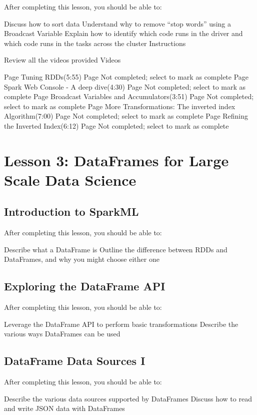 After completing this lesson, you should be able to:

Discuss how to sort data
Understand why to remove “stop words” using a Broadcast Variable
Explain how to identify which code runs in the driver and which code runs in the tasks across the cluster
Instructions

Review all the videos provided
Videos

Page Tuning RDDs(5:55) Page Not completed; select to mark as complete
Page Spark Web Console - A deep dive(4:30) Page Not completed; select to mark as complete
Page Broadcast Variables and Accumulators(3:51) Page Not completed; select to mark as complete
Page More Transformations: The inverted index Algorithm(7:00) Page Not completed; select to mark as complete
Page Refining the Inverted Index(6:12) Page Not completed; select to mark as complete


\newpage
\section{Lesson 3: DataFrames for Large Scale Data Science}

\subsection{Introduction to SparkML}

After completing this lesson, you should be able to:

Describe what a DataFrame is
Outline the difference between RDDs and DataFrames, and why you might choose either one

\subsection{Exploring the DataFrame API}

After completing this lesson, you should be able to:

Leverage the DataFrame API to perform basic transformations
Describe the various ways DataFrames can be used
\subsection{DataFrame Data Sources I}

After completing this lesson, you should be able to:

Describe the various data sources supported by DataFrames
Discuss how to read and write JSON data with DataFrames
